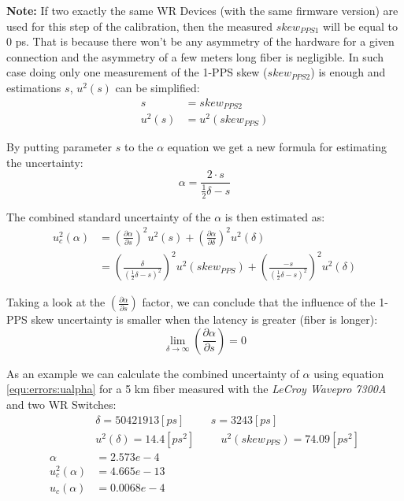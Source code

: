 {\bf Note:} If two exactly the same WR Devices (with the same firmware version)
are used for this step of the calibration, then the measured $skew_{PPS1}$ will
be equal to 0 ps. That is because there won't be any asymmetry of the hardware
for a given connection and the asymmetry of a few meters long fiber is
negligible. In such case doing only one measurement of the 1-PPS skew
($skew_{PPS2}$) is enough and estimations $s$, $u^2(s)$ can be simplified:
\begin{align}
	s &= skew_{PPS2}\\
  u^2(s) &= u^2(skew_{PPS})
\end{align}

\noindent By putting parameter $s$ to the $\alpha$ equation we get a new
formula for estimating the uncertainty:
\begin{equation}
	\alpha = \frac{2\cdot s}{\frac{1}{2}\delta - s}
\end{equation}

\noindent The combined standard uncertainty of the $\alpha$ is then estimated as:
\begin{align}
	\label{equ:errors:ualpha}
	u_c^2(\alpha) &= \left( \frac{\partial \alpha}{\partial s} \right)^2 u^2(s) + \left(
	\frac{\partial \alpha}{\partial \delta} \right)^2 u^2(\delta) \nonumber\\
  & = \left( \frac{\delta}{(\frac{1}{2}\delta - s)^2} \right)^2 u^2(skew_{PPS}) + \left(
	\frac{-s}{(\frac{1}{2}\delta - s)^2} \right)^2 u^2(\delta)
\end{align}

Taking a look at the $\left( \frac{\partial \alpha}{\partial s} \right)$ factor,
we can conclude that the influence of the 1-PPS skew uncertainty is smaller when
the latency is greater (fiber is longer):
\begin{equation}
	\lim_{\delta \to \infty} \left( \frac{\partial \alpha}{\partial s} \right) = 0
\end{equation}

As an example we can calculate the combined uncertainty of $\alpha$ using
equation \ref{equ:errors:ualpha} for a 5 km fiber measured with the \emph{LeCroy
Wavepro 7300A} and two WR Switches:
\begin{align}
  &\delta = 50421913 [ps] \hspace{1cm} s = 3243 [ps]\nonumber \\
  &u^2(\delta) = 14.4 [ps^2] \hspace{1cm} u^2(skew_{PPS}) = 74.09 [ps^2] \nonumber \\
	\label{equ:errors:alpha}
	\alpha &= 2.573e-4 \\
	\label{equ:errors:unc_alpha}
  u_c^2(\alpha) &= 4.665e-13\\
	\label{equ:errors:stdev_alpha}
  u_c(\alpha) &= 0.0068e-4
\end{align}

